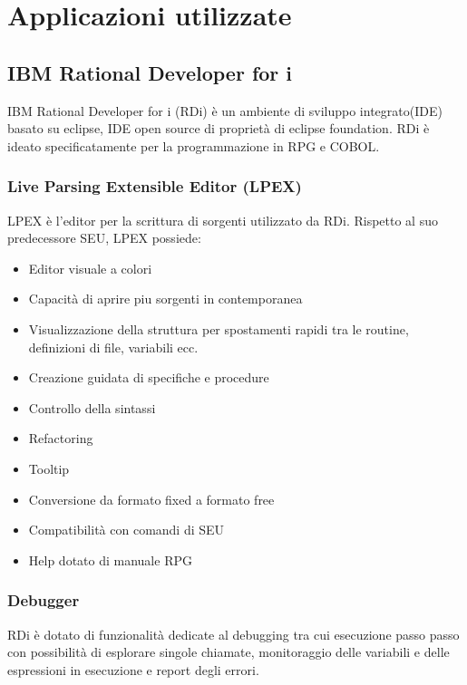 \documentclass[target=bach,aauheader=,style=]{thud}
\begin{document}
\chapter{Applicazioni utilizzate}
\section{IBM Rational Developer for i}
IBM Rational Developer for i (RDi) è un ambiente di sviluppo integrato(IDE) basato su eclipse, IDE open source di proprietà di eclipse foundation.
RDi è ideato specificatamente per la programmazione in RPG e COBOL.

\subsection{Live Parsing Extensible Editor (LPEX)}
LPEX è l'editor per la scrittura di sorgenti utilizzato da RDi. Rispetto al suo predecessore SEU, LPEX possiede:
\begin{itemize}
    \setlength{\itemsep}{0pt} %
    \item Editor visuale a colori
    \item Capacità di aprire piu sorgenti in contemporanea
    \item Visualizzazione della struttura per spostamenti rapidi tra le routine, definizioni di file, variabili ecc.
    \item Creazione guidata di specifiche e procedure
    \item Controllo della sintassi
    \item Refactoring
    \item Tooltip
    \item Conversione da formato fixed a formato free 
    \item Compatibilità con comandi di SEU
    \item Help dotato di manuale RPG
\end{itemize}

\subsection{Debugger}
RDi è dotato di funzionalità dedicate al debugging tra cui esecuzione passo passo con possibilità di esplorare singole chiamate, monitoraggio delle variabili e delle espressioni in esecuzione e report degli errori.
\end{document}
